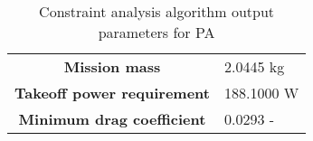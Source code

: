\begin{savenotes}
\begin{table}[H]
\begin{tabular}{@{}Cl@{}}
    \textbf{Mission mass}                                           & 2.0445 \si{\kilo\gram}                 \\
    \textbf{Takeoff power requirement}                              & 188.1000 \si{\watt}\\
    \textbf{Minimum drag coefficient}                               & 0.0293 -                   \\ \bottomrule
    \end{tabular}
\caption{Constraint analysis algorithm output parameters for PA}
\label{tab: pa_output}
\end{table}
\end{savenotes}